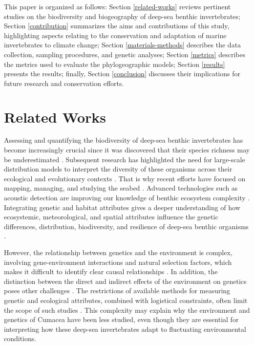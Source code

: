 This paper is organized as follows: Section \autoref{related-works} reviews pertinent studies on the biodiversity and biogeography of deep-sea benthic invertebrates; Section \autoref{contribution} summarizes the aims and contributions of this study, highlighting aspects relating to the conservation and adaptation of marine invertebrates to climate change; Section \autoref{materials-methods} describes the data collection, sampling procedures, and genetic analyses; Section \autoref{metrics} describes the metrics used to evaluate the phylogeographic models; Section \autoref{results} presents the results; finally, Section \autoref{conclusion} discusses their implications for future research and conservation efforts.

\section{Related Works}\label{related-works}
Assessing and quantifying the biodiversity of deep-sea benthic invertebrates has become increasingly crucial since it was discovered that their species richness may be underestimated \citep{grassle1992deep}. Subsequent research has highlighted the need for large-scale distribution models to interpret the diversity of these organisms across their ecological and evolutionary contexts \citep{rex1997large}. That is why recent efforts have focused on mapping, managing, and studying the seabed \citep{brown2011benthic}. Advanced technologies such as acoustic detection are improving our knowledge of benthic ecosystem complexity \citep{brown2011benthic}. Integrating genetic and habitat attributes gives a deeper understanding of how ecosystemic, meteorological, and spatial attributes influence the genetic differences, distribution, biodiversity, and resilience of deep-sea benthic organisms \citep{vrijenhoek2009cryptic}.

However, the relationship between genetics and the environment is complex, involving gene-environment interactions and natural selection factors, which makes it difficult to identify clear causal relationships \citep{balkenhol_identifying_2009}. In addition, the distinction between the direct and indirect effects of the environment on genetics poses other challenges \citep{manel_perspectives_2010, balkenhol_landscape_2019}. The restrictions of available methods for measuring genetic and ecological attributes, combined with logistical constraints, often limit the scope of such studies \citep{manel_perspectives_2010, shafer_widespread_2013}. This complexity may explain why the environment and genetics of Cumacea have been less studied, even though they are essential for interpreting how these deep-sea invertebrates adapt to fluctuating environmental conditions.

